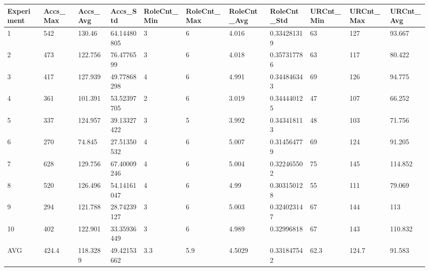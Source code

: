 \begin{table}[H]
\begin{adjustbox}{max width=380pt,keepaspectratio,angle=90}
\begin{tabular}{|l|l|l|l|l|l|l|l|l|l|l|}
				\end{tabular}
			\end{adjustbox}
			\begin{adjustbox}{max width=380pt,keepaspectratio,angle=90}
				\begin{tabular}{|l|l|l|l|l|l|l|l|l|l|l|}
					\rowcolor[HTML]{EFEFEF} 
					\hline
					Experiment & Accs\_Max & Accs\_Avg & Accs\_Std   & RoleCnt\_Min & RoleCnt\_Max & RoleCnt\_Avg & RoleCnt\_Std & URCnt\_Min & URCnt\_Max & URCnt\_Avg \\ \hline
					1          & 542       & 130.46    & 64.14480805 & 3            & 6            & 4.016        & 0.334281319  & 63         & 127        & 93.667     \\ \hline
					2          & 473       & 122.756   & 76.4776599  & 3            & 6            & 4.018        & 0.357317786  & 63         & 117        & 80.422     \\ \hline
					3          & 417       & 127.939   & 49.77868298 & 4            & 6            & 4.991        & 0.344846343  & 69         & 126        & 94.775     \\ \hline
					4          & 361       & 101.391   & 53.52397705 & 2            & 6            & 3.019        & 0.344440125  & 47         & 107        & 66.252     \\ \hline
					5          & 337       & 124.957   & 39.13327422 & 3            & 5            & 3.992        & 0.343418113  & 48         & 103        & 71.756     \\ \hline
					6          & 270       & 74.845    & 27.51350532 & 4            & 6            & 5.007        & 0.314564779  & 69         & 124        & 91.205     \\ \hline
					7          & 628       & 129.756   & 67.40009246 & 4            & 6            & 5.004        & 0.322465502  & 75         & 145        & 114.852    \\ \hline
					8          & 520       & 126.496   & 54.14161047 & 4            & 6            & 4.99         & 0.303150128  & 55         & 111        & 79.069     \\ \hline
					9          & 294       & 121.788   & 28.74239127 & 3            & 6            & 5.003        & 0.324023147  & 67         & 144        & 113        \\ \hline
					10         & 402       & 122.901   & 33.35936449 & 3            & 6            & 4.989        & 0.32996818   & 67         & 143        & 110.832    \\ \hline\hline
					AVG        & 424.4     & 118.3289  & 49.42153662 & 3.3          & 5.9          & 4.5029       & 0.331847542  & 62.3       & 124.7      & 91.583     \\ \hline

\end{tabular}
\end{adjustbox}
\end{table}
